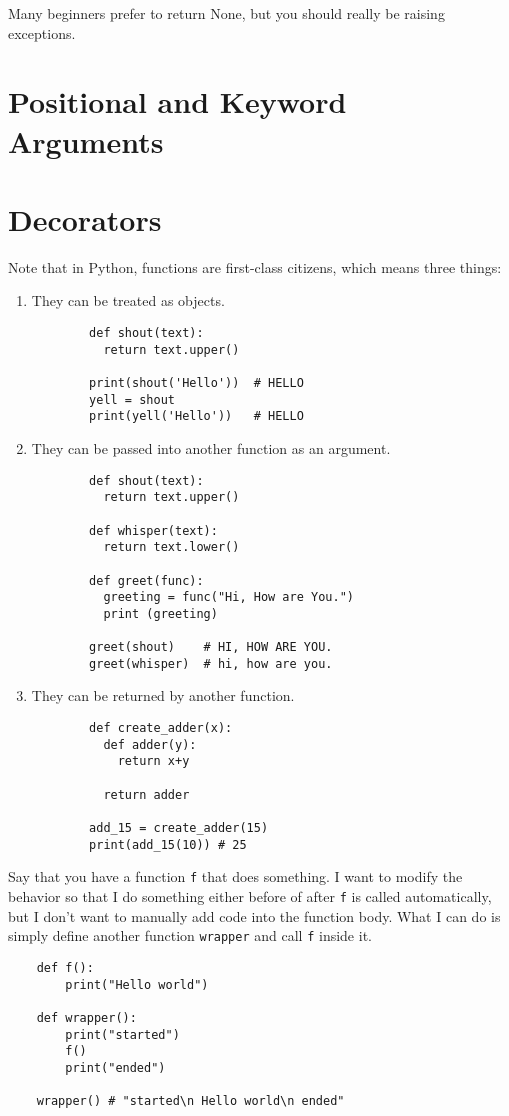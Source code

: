 \documentclass{article}
\begin{document}
  Many beginners prefer to return None, but you should really be raising exceptions. 

\section{Positional and Keyword Arguments} 

\section{Decorators}

  Note that in Python, functions are first-class citizens, which means three things: 
  \begin{enumerate}
    \item They can be treated as objects. 
      \begin{lstlisting}
        def shout(text): 
          return text.upper() 

        print(shout('Hello'))  # HELLO 
        yell = shout 
        print(yell('Hello'))   # HELLO
      \end{lstlisting}
    \item They can be passed into another function as an argument. 
      \begin{lstlisting}
        def shout(text): 
          return text.upper() 

        def whisper(text): 
          return text.lower() 

        def greet(func): 
          greeting = func("Hi, How are You.")
          print (greeting) 

        greet(shout)    # HI, HOW ARE YOU.
        greet(whisper)  # hi, how are you. 
      \end{lstlisting}
    \item They can be returned by another function. 
      \begin{lstlisting}
        def create_adder(x): 
          def adder(y): 
            return x+y 

          return adder 

        add_15 = create_adder(15) 
        print(add_15(10)) # 25 
      \end{lstlisting}
  \end{enumerate}

  Say that you have a function \texttt{f} that does something. I want to modify the behavior so that I do something either before of after \texttt{f} is called automatically, but I don't want to manually add code into the function body. What I can do is simply define another function \texttt{wrapper} and call \texttt{f} inside it. 
  \begin{lstlisting}
    def f(): 
        print("Hello world") 

    def wrapper(): 
        print("started") 
        f()
        print("ended") 

    wrapper() # "started\n Hello world\n ended"
  \end{lstlisting}
\end{document}
